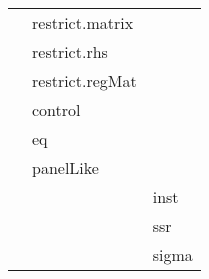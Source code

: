 \begin{table}[htbp]
\begin{tabular}{lll}
                & restrict.matrix& \\
                & restrict.rhs   & \\
                & restrict.regMat& \\
                & control        & \\
                & eq             & \\
                & panelLike      & \\
                &                & inst \\
                &                & ssr \\
                &                & sigma \\
\hline
\end{tabular}
\end{table}
